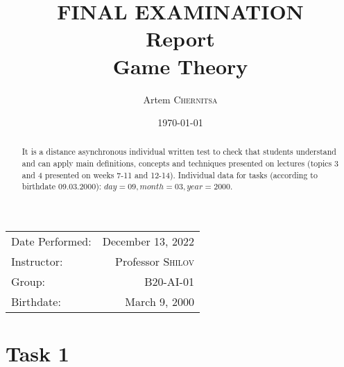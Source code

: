 \documentclass[
	a4paper, %
	11pt, %
]{CSUniSchoolLabReport}
\title{FINAL EXAMINATION \\ Report \\ Game Theory} %
\author{Artem \textsc{Chernitsa}} %
\date{\today} %
\begin{document}
\maketitle %

\begin{center}
	\begin{tabular}{l r}
		Date Performed: & December 13, 2022 \\ %
		Instructor: & Professor \textsc{Shilov} \\ %
            Group: & B20-AI-01 \\
            Birthdate: & March 9, 2000
	\end{tabular}
\end{center}

\begin{abstract}
    It is a distance asynchronous individual written test to check that students understand and can apply main definitions, concepts and techniques presented on lectures (topics 3 and 4 presented on weeks 7-11 and 12-14). Individual data for tasks (according to birthdate 09.03.2000): $day = 09, month = 03, year = 2000$.
\end{abstract}


\section{Task 1}




\end{document}
